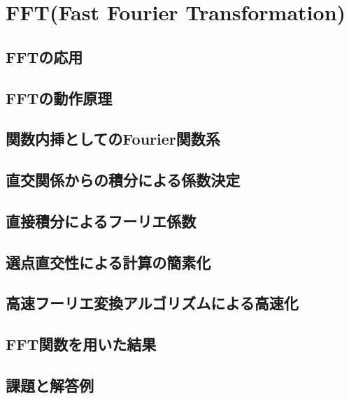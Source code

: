\documentclass[10pt,a4j]{jsbook}
\begin{document}
\chapter{FFT(Fast Fourier Transformation)}
\section{FFTの応用}
 
\section{FFTの動作原理}
 
\section{関数内挿としてのFourier関数系}
 
\section{直交関係からの積分による係数決定}
 
\section{直接積分によるフーリエ係数}

\section{選点直交性による計算の簡素化}

\section{高速フーリエ変換アルゴリズムによる高速化}

\section{FFT関数を用いた結果}

\section{課題と解答例}

\end{document}

